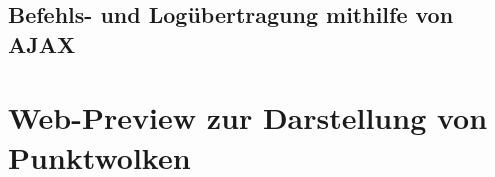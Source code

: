 \documentclass[xcolor=dvipsnames,11pt,paper=a4paper]{report}
\begin{document}
\subsection{Befehls- und Logübertragung mithilfe von AJAX}



\section{Web-Preview zur Darstellung von Punktwolken}




\end{document}
